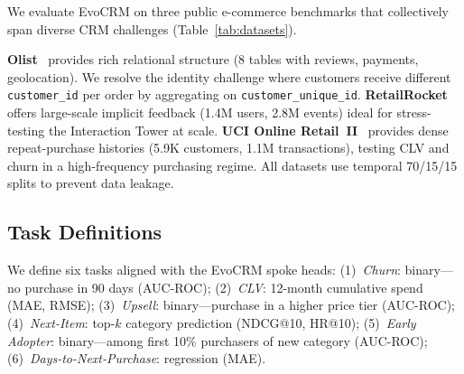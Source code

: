 \documentclass[10pt,twocolumn]{article}
\begin{document}
We evaluate EvoCRM on three public e-commerce benchmarks that collectively span diverse CRM challenges (Table~\ref{tab:datasets}).

\begin{table}[t]
\centering
\caption{Dataset statistics. $|\mathcal{U}|$: unique customers; $|\mathcal{I}|$: interactions; Cat.: product categories.}
\label{tab:datasets}
\end{table}

\textbf{Olist}~\cite{olist2018} provides rich relational structure (8 tables with reviews, payments, geolocation). We resolve the identity challenge where customers receive different \texttt{customer\_id} per order by aggregating on \texttt{customer\_unique\_id}.
\textbf{RetailRocket}~\cite{retailrocket2016} offers large-scale implicit feedback (1.4M users, 2.8M events) ideal for stress-testing the Interaction Tower at scale.
\textbf{UCI Online Retail~II}~\cite{uci2019} provides dense repeat-purchase histories (5.9K customers, 1.1M transactions), testing CLV and churn in a high-frequency purchasing regime.
All datasets use temporal 70/15/15 splits to prevent data leakage.

\subsection{Task Definitions}

We define six tasks aligned with the EvoCRM spoke heads:
(1)~\emph{Churn}: binary---no purchase in 90 days (AUC-ROC);
(2)~\emph{CLV}: 12-month cumulative spend (MAE, RMSE);
(3)~\emph{Upsell}: binary---purchase in a higher price tier (AUC-ROC);
(4)~\emph{Next-Item}: top-$k$ category prediction (NDCG@10, HR@10);
(5)~\emph{Early Adopter}: binary---among first 10\% purchasers of new category (AUC-ROC);
(6)~\emph{Days-to-Next-Purchase}: regression (MAE).
\end{document}
